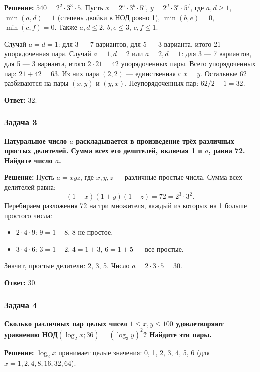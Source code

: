 \documentclass[12pt, a4paper]{article}
\begin{document}
\textbf{Решение:}
$540 = 2^2 \cdot 3^3 \cdot 5$. Пусть $x = 2^a \cdot 3^b \cdot 5^c$, $y = 2^d \cdot 3^e \cdot 5^f$, где $a,d \ge 1$, $\min(a,d) = 1$ (степень двойки в НОД ровно 1), $\min(b,e) = 0$, $\min(c,f) = 0$. Также $a,d \le 2$, $b,e \le 3$, $c,f \le 1$.

Случай $a = d = 1$: для 3 — 7 вариантов, для 5 — 3 варианта, итого 21 упорядоченная пара.
Случай $a = 1, d = 2$ или $a = 2, d = 1$: для 3 — 7 вариантов, для 5 — 3 варианта, итого $2 \cdot 21 = 42$ упорядоченных пары.
Всего упорядоченных пар: $21 + 42 = 63$. Из них пара $(2,2)$ — единственная с $x = y$. Остальные 62 разбиваются на пары $(x,y)$ и $(y,x)$. Неупорядоченных пар: $62/2 + 1 = 32$.

\textbf{Ответ:} 32.

\subsubsection*{Задача 3}
\textbf{Натуральное число $a$ раскладывается в произведение трёх различных простых делителей. Сумма всех его делителей, включая 1 и $a$, равна 72. Найдите число $a$.}

\textbf{Решение:}
Пусть $a = xyz$, где $x, y, z$ — различные простые числа. Сумма всех делителей равна:
\[
(1+x)(1+y)(1+z) = 72 = 2^3 \cdot 3^2.
\]
Перебираем разложения 72 на три множителя, каждый из которых на 1 больше простого числа:
\begin{itemize}
    \item $2 \cdot 4 \cdot 9$: $9 = 1+8$, 8 не простое.
    \item $3 \cdot 4 \cdot 6$: $3 = 1+2$, $4 = 1+3$, $6 = 1+5$ — все простые.
\end{itemize}
Значит, простые делители: 2, 3, 5. Число $a = 2 \cdot 3 \cdot 5 = 30$.

\textbf{Ответ:} 30.

\subsubsection*{Задача 4}
\textbf{Сколько различных пар целых чисел $1 \le x, y \le 100$ удовлетворяют уравнению НОД$(\log_2 x; 36) = (\log_3 y)^2$? Найдите эти пары.}

\textbf{Решение:}
$\log_2 x$ принимает целые значения: 0, 1, 2, 3, 4, 5, 6 (для $x = 1, 2, 4, 8, 16, 32, 64$).
\end{document}
